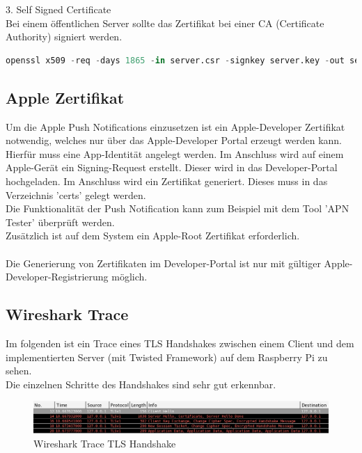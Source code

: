 3. Self Signed Certificate\\
Bei einem öffentlichen Server sollte das Zertifikat bei einer CA (Certificate Authority) signiert werden. \\
\begin{lstlisting}[caption =Self Signed Certificate, language=python, frame=single, breaklines=true,columns=fullflexible, commentstyle=\color{gray}\upshape, captionpos=b]
openssl x509 -req -days 1865 -in server.csr -signkey server.key -out server.crt
\end{lstlisting}

\subsection{Apple Zertifikat}
Um die Apple Push Notifications\cite{applepush} einzusetzen ist ein Apple-Developer Zertifikat notwendig, welches nur über das Apple-Developer Portal erzeugt werden kann. Hierfür muss eine App-Identität angelegt werden. Im Anschluss wird auf einem Apple-Gerät ein Signing-Request erstellt. Dieser wird in das Developer-Portal hochgeladen. Im Anschluss wird ein Zertifikat generiert. Dieses muss in das Verzeichnis 'certs' gelegt werden. \\
Die Funktionalität der Push Notification kann zum Beispiel mit dem Tool 'APN Tester'\cite{apntester} überprüft werden.\\
Zusätzlich ist auf dem System ein Apple-Root Zertifikat erforderlich.\\\\
Die Generierung von Zertifikaten im Developer-Portal ist nur mit gültiger Apple-Developer-Registrierung möglich.

\subsection{Wireshark Trace}
Im folgenden ist ein Trace eines TLS Handshakes zwischen einem Client und dem implementierten Server (mit Twisted Framework) auf dem Raspberry Pi zu sehen. \\
Die einzelnen Schritte des Handshakes sind sehr gut erkennbar.\\
\begin{figure}[h]
\begin{minipage}{\textwidth}
            \centering
            \includegraphics[width=\textwidth]{./data/wireshark.png}
            \caption{Wireshark Trace TLS Handshake}
        \end{minipage}
\end{figure}